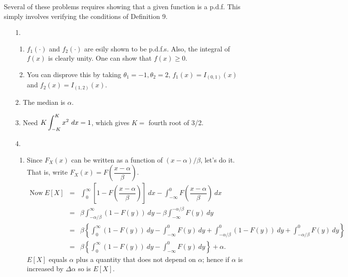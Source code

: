 \noindent Several of these problems requires showing that a given function is a p.d.f.  This simply involves verifying the conditions of Definition 9.
\begin{enumerate}
	\item[1.] \begin{enumerate}
		
		\item $f_1(\cdot)$ and $f_2(\cdot)$ are esily shown to be p.d.f.s.  Also, the integral of $f(x)$ is clearly unity.  One can show that $f(x) \ge 0$.
		
		\item You can disprove this by taking $\theta_1 = -1, \theta_2 = 2$, $f_1(x) = I_{(0,1)}(x)$ and $f_2(x) = I_{(1,2)}(x)$.
		
	\end{enumerate}

	\item[2.] The median is $\alpha$.
	
	\item[3.] Need $\displaystyle K \int_{-K}^{K} x^2\ dx = 1$, which gives $K=$ fourth root of 3/2.
	
	\item[4.] \begin{enumerate}
	
		\item Since $F_X(x)$ can be written as a function of $(x- \alpha)/\beta$, let's do it.  That is, write $F_X(x) = F\left(\dfrac{x-\alpha}{\beta}\right)$.
		\begin{eqnarray*}
		\text{Now}\ E[X] &=& \int_{0}^{\infty} \left[ 1 - F\left(\dfrac{x- \alpha}{\beta}\right) \right]\ dx- \int_{-\infty}^{0} F\left(\dfrac{x- \alpha}{\beta}\right)\ dx \\
		&=& \beta \int_{-\alpha/\beta}^{\infty}(1- F(y))\ dy- \beta \int_{-\infty}^{-\alpha/\beta} F(y)\ dy \\
		&=& \beta \left\{ \int_{0}^{\infty} (1- F(y))\ dy - \int_{-\infty}^{0} F(y)\ dy + \int_{-\alpha/\beta}^{0}(1- F(y))\ dy +  \int_{-\alpha/\beta}^{0} F(y)\ dy \right\} \\
		&=&  \beta \left\{ \int_{0}^{\infty} (1- F(y))\ dy - \int_{-\infty}^{0} F(y)\ dy  \right\} + \alpha. 
		\end{eqnarray*}
		$E[X]$ equals $\alpha$ plus a quantity that does not depend on $\alpha$; hence if $\alpha$ is increased by $\Delta\alpha$ so is $E[X]$.
		
		\end{enumerate} 
		

\end{enumerate}

